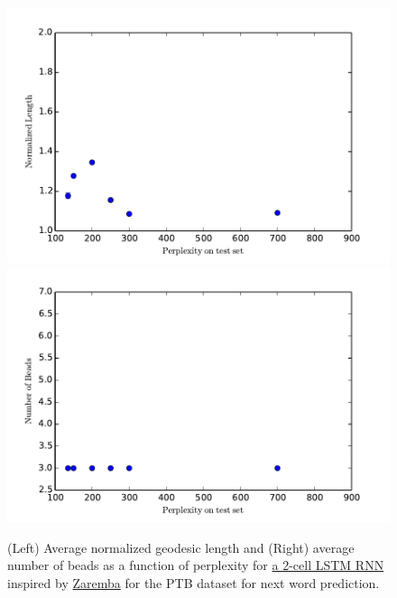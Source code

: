\begin{figure}
\label{PTBfigs}
\centering
\includegraphics[width=.4\textwidth]{../Plots/normlengthPTB}
\includegraphics[width=.4\textwidth]{../Plots/numbeadsPTB}
\caption{(Left) Average normalized geodesic length and (Right) average number of beads as a function of perplexity for \href{github.com/danielfreeman11/convex-nets/tree/master/LaunchScripts/PTBRNN.ipynb}{a 2-cell LSTM RNN} inspired by \href{arxiv.org/pdf/1409.2329.pdf}{Zaremba} for the PTB dataset for next word prediction.}
\end{figure}


